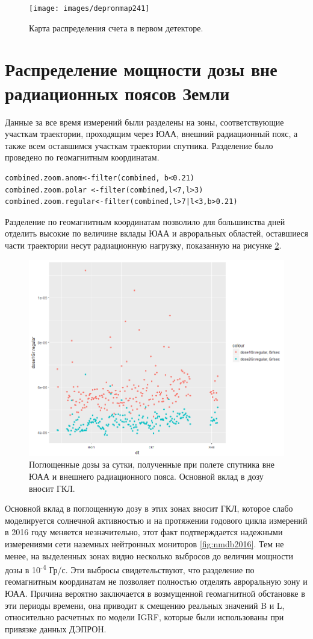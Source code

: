 \begin{figure}[h]
	\centering
	\texttt{[image: images/depronmap241]}
	\caption{Карта распределения счета в первом детекторе.}
	\label{fig:depronmap241}
\end{figure}

\section{Распределение мощности дозы вне радиационных поясов Земли}
Данные за все время измерений были разделены на зоны, соответствующие участкам траектории, проходящим через ЮАА, внешний радиационный пояс, а также всем оставшимся участкам траектории спутника. Разделение было проведено по геомагнитным координатам. 
\begin{verbatim}
combined.zoom.anom<-filter(combined, b<0.21)
combined.zoom.polar <-filter(combined,l<7,l>3)
combined.zoom.regular<-filter(combined,l>7|l<3,b>0.21)
\end{verbatim}
Разделение по геомагнитным координатам позволило для большинства дней отделить высокие по величине вклады ЮАА и авроральных областей, оставшиеся части траектории несут радиационную нагрузку, показанную на рисунке \ref{fig:gcrdose}. 
\begin{figure}
	\centering
	\includegraphics[width=0.5\linewidth]{images/doseanalisys/GCRdose}
	\caption{Поглощенные дозы за сутки, полученные при полете спутника вне ЮАА и внешнего радиационного пояса. Основной вклад в дозу вносит ГКЛ.}
	\label{fig:gcrdose}
\end{figure}
Основной вклад в поглощенную дозу в этих зонах вносит ГКЛ, которое слабо моделируется солнечной активностью и на протяжении годового цикла измерений в 2016 году меняется незначительно, этот факт подтверждается надежными измерениями сети наземных нейтронных мониторов \ref{fig:nmdb2016}. Тем не менее, на выделенных зонах видно несколько выбросов до величин мощности дозы в 10\textsuperscript{-4} Гр/с. Эти выбросы свидетельствуют, что разделение по геомагнитным координатам не позволяет полностью отделять авроральную зону и ЮАА. Причина вероятно заключается в возмущенной геомагнитной обстановке в эти периоды времени, она приводит к смещению реальных значений B и L, относительно расчетных по модели IGRF, которые были использованы при привязке данных ДЭПРОН.


